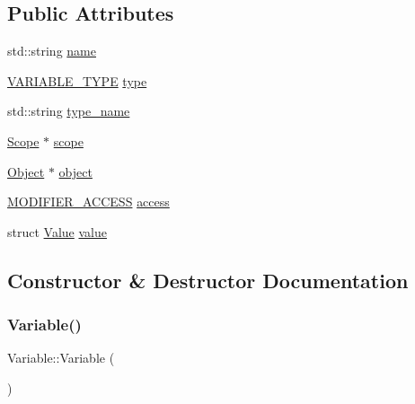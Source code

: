 \subsection*{Public Attributes}
\begin{DoxyCompactItemize}
\item 
std\+::string \hyperlink{classVariable_aaf7205662069a5f8f673c158cb31f418}{name}
\item 
\hyperlink{statics_8h_a4c85b3a98d55cc0252806c950379cce0}{V\+A\+R\+I\+A\+B\+L\+E\+\_\+\+T\+Y\+PE} \hyperlink{classVariable_abd520a8f2c14e6bde4dbabc842094b03}{type}
\item 
std\+::string \hyperlink{classVariable_ac237e4099c004a617ad8bd2effbfafb2}{type\+\_\+name}
\item 
\hyperlink{classScope}{Scope} $\ast$ \hyperlink{classVariable_a1d7f7a674747e42e4ecc5267252c12d4}{scope}
\item 
\hyperlink{classObject}{Object} $\ast$ \hyperlink{classVariable_aea57391bcc48e74c9d8cae131612ff0b}{object}
\item 
\hyperlink{statics_8h_a0cbe4939ec6da73b52afbebd794d60ba}{M\+O\+D\+I\+F\+I\+E\+R\+\_\+\+A\+C\+C\+E\+SS} \hyperlink{classVariable_a20553c67076b2c5a27cc0d35b4cc65b3}{access}
\item 
struct \hyperlink{classValue}{Value} \hyperlink{classVariable_a94151da0f0a411749f84aaf65a9c7045}{value}
\end{DoxyCompactItemize}


\subsection{Constructor \& Destructor Documentation}
\mbox{\label{classVariable_a5716c9dcafcc8cf59a6f6b5dac3ec7a2}} 
\subsubsection{\texorpdfstring{Variable()}{Variable()}}
{\footnotesize\ttfamily Variable\+::\+Variable (\begin{DoxyParamCaption}{ }\end{DoxyParamCaption})}

\mbox{\label{classVariable_abeaf0f45e2b8d0b063b567d6491604fd}} 
